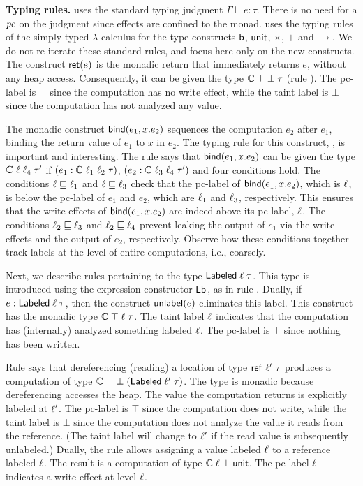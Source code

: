 \medskip
\noindent\textbf{Typing rules.}  {\cg} uses the standard typing
judgment $\Gamma \vdash e: \tau$. There is no need for a $\mathit{pc}$ on the
judgment since effects are confined to the monad. {\cg} uses the
typing rules of the simply typed $\lambda$-calculus for the type
constructs $\mathsf{b}$, $\mathsf{unit}$, $\times$, $+$ and $\rightarrow$. We do
not re-iterate these standard rules, and focus here only on the new
constructs. The construct $\mathsf{ret}(e)$ is the monadic return that
immediately returns $e$, without any heap access. Consequently, it can
be given the type $\mathbb{C}\;\top\;\bot\;\tau$ (rule
). The pc-label is $\top$ since the computation has
no write effect, while the taint label is $\bot$ since the computation
has not analyzed any value.

The monadic construct $\mathsf{bind}(e_1, x.e_2)$ sequences the computation
$e_2$ after $e_1$, binding the return value of $e_1$ to $x$ in
$e_2$. The typing rule for this construct, , is
important and interesting. The rule says that $\mathsf{bind}(e_1, x.e_2)$ can
be given the type $\mathbb{C}\;\ell\;\ell_4\;\tau'$ if $(e_1:
\mathbb{C}\;\ell_1\;\ell_2\;\tau)$, $(e_2:
\mathbb{C}\;\ell_3\;\ell_4\;\tau')$ and four conditions hold. The
conditions $\ell \sqsubseteq \ell_1$ and $\ell \sqsubseteq \ell_3$
check that the pc-label of $\mathsf{bind}(e_1, x.e_2)$, which is $\ell$,
is below the pc-label of $e_1$ and $e_2$, which are $\ell_1$ and
$\ell_3$, respectively. This ensures that the write effects of
$\mathsf{bind}(e_1, x.e_2)$ are indeed above its pc-label, $\ell$. The
conditions $\ell_2 \sqsubseteq \ell_3$ and $\ell_2 \sqsubseteq
\ell_4$ prevent leaking the output of $e_1$ via
the write effects and the output of $e_2$, respectively. Observe how
these conditions together track labels at the level of entire
computations, i.e., coarsely.

Next, we describe rules pertaining to the type
$\mathsf{Labeled}\;\ell\;\tau$. This type is introduced using the
expression constructor $\mathsf{Lb}_{}$, as in rule
. Dually, if $e: \mathsf{Labeled}\;\ell\;\tau$, then
the construct $\mathsf{unlabel}(e)$ eliminates this label. This construct has
the monadic type $\mathbb{C}\;\top\;\ell\;\tau$. The taint label
$\ell$ indicates that the computation has (internally) analyzed
something labeled $\ell$. The pc-label is $\top$ since nothing has
been written.

Rule  says that dereferencing (reading) a location
of type $\mathsf{ref}~\ell'~\tau$ produces a computation of type
$\mathbb{C}\;\top\;\bot\;(\mathsf{Labeled}\;\ell'\;\tau)$. The type is monadic
because dereferencing accesses the heap. The value the computation
returns is explicitly labeled at $\ell'$. The pc-label is $\top$
since the computation does not write, while the taint label is $\bot$
since the computation does not analyze the value it reads from the
reference. (The taint label will change to $\ell'$ if the read value
is subsequently unlabeled.) Dually, the rule 
allows assigning a value labeled $\ell$ to a reference labeled
$\ell$. The result is a computation of type
$\mathbb{C}\;\ell\;\bot\;\mathsf{unit}$. The pc-label $\ell$ indicates a
write effect at level $\ell$.

